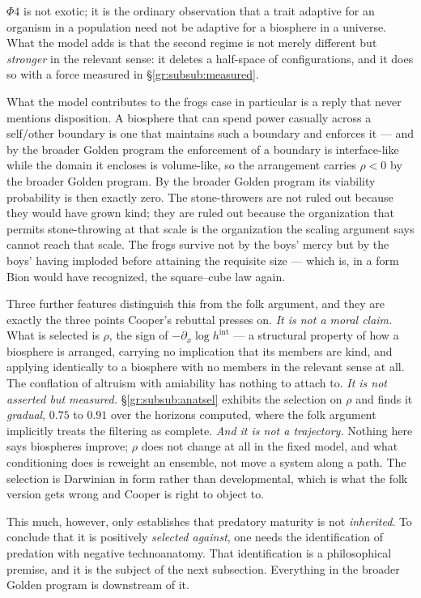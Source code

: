 \documentclass[11pt]{article}
\theoremstyle{plain}
\theoremstyle{definition}
\theoremstyle{remark}
\begin{document}
$\Phi4$ is not exotic; it is the ordinary observation that a trait
adaptive for an organism in a population need not be adaptive for a
biosphere in a universe. What the model adds is that the second regime
is not merely different but \emph{stronger} in the relevant sense: it
deletes a half-space of configurations, and it does so with a force
measured in \S\ref{gr:subsub:measured}.

What the model contributes to the frogs case in particular is a reply
that never mentions disposition. A biosphere that can spend power
casually across a self/other boundary is one that maintains such a
boundary and enforces it --- and by the broader Golden program the
enforcement of a boundary is interface-like while the domain it encloses
is volume-like, so the arrangement carries $\rho<0$ by
the broader Golden program. By the broader Golden program its
viability probability is then exactly zero. The stone-throwers are not
ruled out because they would have grown kind; they are ruled out
because the organization that permits stone-throwing at that scale is
the organization the scaling argument says cannot reach that scale. The
frogs survive not by the boys' mercy but by the boys' having imploded
before attaining the requisite size --- which is, in a form Bion would
have recognized, the square--cube law again.

Three further features distinguish this from the folk argument, and they
are exactly the three points Cooper's rebuttal presses on. \emph{It is not
a moral claim.} What is selected is $\rho$, the sign of
$-\partial_x\log h^{\mathrm{int}}$ --- a structural property of how a
biosphere is arranged, carrying no implication that its members are
kind, and applying identically to a biosphere with no members in the
relevant sense at all. The conflation of altruism with amiability has
nothing to attach to. \emph{It is not asserted but measured.}
\S\ref{gr:subsub:anatsel} exhibits the selection on $\rho$ and finds it
\emph{gradual}, $0.75$ to $0.91$ over the horizons computed, where the folk argument implicitly treats the filtering as complete.
\emph{And it is not a trajectory.} Nothing here says biospheres improve;
$\rho$ does not change at all in the fixed model, and what conditioning
does is reweight an ensemble, not move a system along a path. The
selection is Darwinian in form rather than developmental, which is
what the folk version gets wrong and Cooper is right to object to.

This much, however, only establishes that predatory maturity is not
\emph{inherited}. To conclude that it is positively \emph{selected
against}, one needs the identification of predation with negative
technoanatomy. That identification is a philosophical premise, and it is
the subject of the next subsection. Everything in
the broader Golden program is downstream of it.
\end{document}
